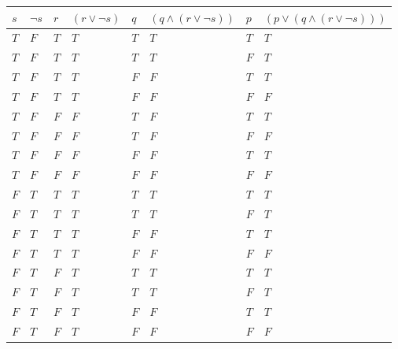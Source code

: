\documentclass{article}%
\begin{document}
\begin{tabular}{l | l | l | l | l | l | l | l |}
    $s$ & $\neg s$  & $r$   & $(r \vee \neg s)$ & $q$ & $(q \wedge (r \vee \neg s))$    & $p$ & $(p \vee (q \wedge (r \vee \neg s)))$ \\ \hline
    $T$ & $F$       & $T$   & $T$               & $T$ & $T$                             & $T$ & $T$ \\ \hline
    $T$ & $F$       & $T$   & $T$               & $T$ & $T$                             & $F$ & $T$ \\ \hline
    $T$ & $F$       & $T$   & $T$               & $F$ & $F$                             & $T$ & $T$ \\ \hline
    $T$ & $F$       & $T$   & $T$               & $F$ & $F$                             & $F$ & $F$ \\ \hline
    $T$ & $F$       & $F$   & $F$               & $T$ & $F$                             & $T$ & $T$ \\ \hline
    $T$ & $F$       & $F$   & $F$               & $T$ & $F$                             & $F$ & $F$ \\ \hline
    $T$ & $F$       & $F$   & $F$               & $F$ & $F$                             & $T$ & $T$ \\ \hline
    $T$ & $F$       & $F$   & $F$               & $F$ & $F$                             & $F$ & $F$ \\ \hline
    $F$ & $T$       & $T$   & $T$               & $T$ & $T$                             & $T$ & $T$ \\ \hline
    $F$ & $T$       & $T$   & $T$               & $T$ & $T$                             & $F$ & $T$ \\ \hline
    $F$ & $T$       & $T$   & $T$               & $F$ & $F$                             & $T$ & $T$ \\ \hline
    $F$ & $T$       & $T$   & $T$               & $F$ & $F$                             & $F$ & $F$ \\ \hline
    $F$ & $T$       & $F$   & $T$               & $T$ & $T$                             & $T$ & $T$ \\ \hline
    $F$ & $T$       & $F$   & $T$               & $T$ & $T$                             & $F$ & $T$ \\ \hline
    $F$ & $T$       & $F$   & $T$               & $F$ & $F$                             & $T$ & $T$ \\ \hline
    $F$ & $T$       & $F$   & $T$               & $F$ & $F$                             & $F$ & $F$ \\
    \hline
\end{tabular}\\
\end{document}
